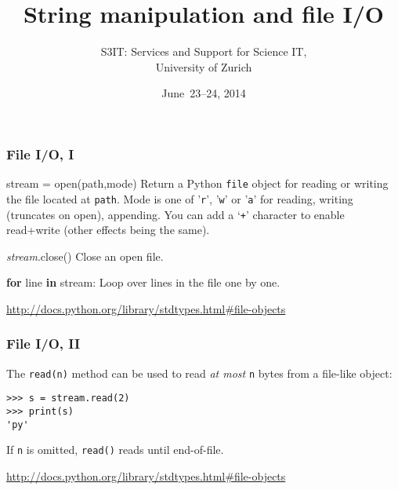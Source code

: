 \documentclass[english,serif,mathserif,xcolor=pdftex,dvipsnames,table]{beamer}
\title[Part 5]{%
  String manipulation and file I/O
}
\author[S3IT]{%
  S3IT: Services and Support for Science IT, \\
  University of Zurich
}
\date{June~23--24, 2014}
\begin{document}
\maketitle

\begin{frame}[fragile]
  \frametitle{File I/O, I}

  \begin{describe}{\ttfamily stream = open(path,mode)}
    Return a Python \texttt{file} object for reading or writing the
    file located at \texttt{path}.  Mode is one of '\texttt{r}',
    '\texttt{w}' or '\texttt{a}' for reading, writing (truncates on open), appending.
    You can add a `\texttt{+}' character to enable read+write (other
    effects being the same).
  \end{describe}

  \begin{describe}{\ttfamily \emph{stream}.close()}
    Close an open file.
  \end{describe}

  \begin{describe}{\ttfamily \textbf{for} line \textbf{in} stream:}
    Loop over lines in the file one by one.
  \end{describe}

  \begin{references}
    \url{http://docs.python.org/library/stdtypes.html#file-objects}
  \end{references}
\end{frame}


\begin{frame}[fragile]
  \frametitle{File I/O, II}

  The \lstinline|read(n)| method can be used to read \emph{at most}
  \lstinline|n| bytes from a file-like object:
\begin{lstlisting}
>>> s = stream.read(2)
>>> print(s)
'py'
\end{lstlisting}
  If \lstinline|n| is omitted, \texttt{read()} reads until end-of-file.

  \begin{references}
    \url{http://docs.python.org/library/stdtypes.html#file-objects}
  \end{references}
\end{frame}
\end{document}
